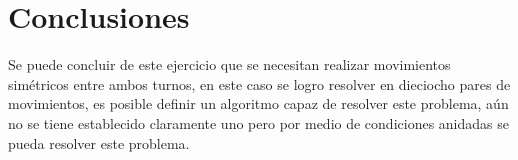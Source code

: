 \documentclass[12pt]{article}
\begin{document}
\section{Conclusiones}

Se puede concluir de este ejercicio que se necesitan realizar movimientos simétricos entre ambos turnos, en este caso se logro resolver en dieciocho pares de movimientos, es posible definir un algoritmo capaz de resolver este problema, aún no se tiene establecido claramente uno pero por medio de condiciones anidadas se pueda resolver este problema.
\end{document}

